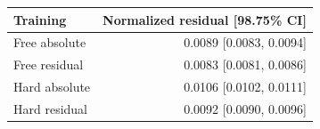 \begin{tabular}{lr}
\toprule
Training & Normalized residual [98.75\% CI] \\
\midrule
Free absolute & 0.0089 [0.0083, 0.0094] \\
Free residual & 0.0083 [0.0081, 0.0086] \\
Hard absolute & 0.0106 [0.0102, 0.0111] \\
Hard residual & 0.0092 [0.0090, 0.0096] \\
\bottomrule
\end{tabular}
